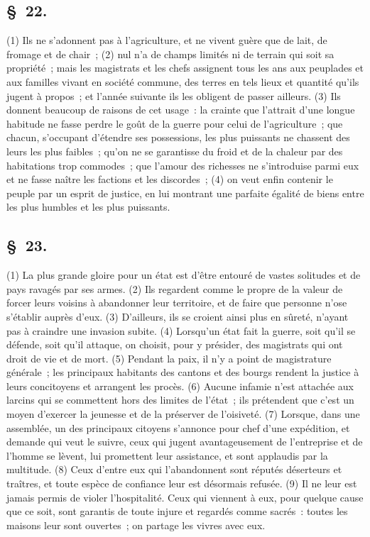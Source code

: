 \documentclass[french,twoside]{book} %
\begin{document}
\subsection[{§ 22.}]{ \textsc{§ 22.} }
\noindent (1) Ils ne s’adonnent pas à l’agriculture, et ne vivent guère que de lait, de fromage et de chair ; (2) nul n’a de champs limités ni de terrain qui soit sa propriété ; mais les magistrats et les chefs assignent tous les ans aux peuplades et aux familles vivant en société commune, des terres en tels lieux et quantité qu’ils jugent à propos ; et l’année suivante ils les obligent de passer ailleurs. (3) Ils donnent beaucoup de raisons de cet usage : la crainte que l’attrait d’une longue habitude ne fasse perdre le goût de la guerre pour celui de l’agriculture ; que chacun, s’occupant d’étendre ses possessions, les plus puissants ne chassent des leurs les plus faibles ; qu’on ne se garantisse du froid et de la chaleur par des habitations trop commodes ; que l’amour des richesses ne s’introduise parmi eux et ne fasse naître les factions et les discordes ; (4) on veut enfin contenir le peuple par un esprit de justice, en lui montrant une parfaite égalité de biens entre les plus humbles et les plus puissants.
\subsection[{§ 23.}]{ \textsc{§ 23.} }
\noindent (1) La plus grande gloire pour un état est d’être entouré de vastes solitudes et de pays ravagés par ses armes. (2) Ils regardent comme le propre de la valeur de forcer leurs voisins à abandonner leur territoire, et de faire que personne n’ose s’établir auprès d’eux. (3) D'ailleurs, ils se croient ainsi plus en sûreté, n’ayant pas à craindre une invasion subite. (4) Lorsqu’un état fait la guerre, soit qu’il se défende, soit qu’il attaque, on choisit, pour y présider, des magistrats qui ont droit de vie et de mort. (5) Pendant la paix, il n’y a point de magistrature générale ; les principaux habitants des cantons et des bourgs rendent la justice à leurs concitoyens et arrangent les procès. (6) Aucune infamie n’est attachée aux larcins qui se commettent hors des limites de l’état ; ils prétendent que c’est un moyen d’exercer la jeunesse et de la préserver de l’oisiveté. (7) Lorsque, dans une assemblée, un des principaux citoyens s’annonce pour chef d’une expédition, et demande qui veut le suivre, ceux qui jugent avantageusement de l’entreprise et de l’homme se lèvent, lui promettent leur assistance, et sont applaudis par la multitude. (8) Ceux d’entre eux qui l’abandonnent sont réputés déserteurs et traîtres, et toute espèce de confiance leur est désormais refusée. (9) Il ne leur est jamais permis de violer l’hospitalité. Ceux qui viennent à eux, pour quelque cause que ce soit, sont garantis de toute injure et regardés comme sacrés : toutes les maisons leur sont ouvertes ; on partage les vivres avec eux.
\end{document}
